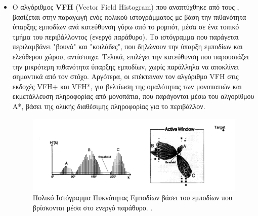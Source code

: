 \begin{itemize}
	
\item 	Ο αλγόριθμος \textbf{VFH} (Vector Field Histogram) που αναπτύχθηκε από τους \citeauthor{vfh} \cite{vfh}, βασίζεται στην παραγωγή ενός πολικού ιστογράμματος με βάση την πιθανότητα ύπαρξης εμποδίων ανά κατεύθυνση γύρω από το ρομπότ, μέσα σε ένα τοπικό τμήμα του περιβάλλοντος (ενεργό παράθυρο). Το ιστόγραμμα που παράγεται περιλαμβάνει "βουνά" και "κοιλάδες", που δηλώνουν την ύπαρξη εμποδίων και ελεύθερου χώρου, αντίστοιχα. Τελικά, επιλέγει την κατεύθυνση που παρουσιάζει την μικρότερη πιθανότητα ύπαρξης εμποδίων, χωρίς παράλληλα να αποκλίνει σημαντικά από τον στόχο. Αργότερα, οι \citeauthor{vfhp} επέκτειναν τον αλγόριθμο VFH στις εκδοχές VFH+\cite{vfhp} και VFH*\cite{vfhs}, για βελτίωση της ομαλότητας των μονοπατιών και εκμετάλλευση πληροφορίας από μονοπάτια, που παράγονται μέσω του αλγορίθμου A*, βάσει της ολικής διαθέσιμης πληροφορίας για το περιβάλλον.

\begin{figure}[!ht]
	\centering
	\includegraphics[width=0.8\linewidth]{Chapters/Chapter3/Figures/vfh.png}
	\caption[Πολικό Ιστόγραμμα Πυκνότητας Εμποδίων βάσει του εμποδίων που βρίσκονται μέσα στο ενεργό παράθυρο.]{Πολικό Ιστόγραμμα Πυκνότητας Εμποδίων βάσει του εμποδίων που βρίσκονται μέσα στο ενεργό παράθυρο. \cite{vfh}.}
	\label{fig:vfh}
\end{figure}
	

\end{itemize}
